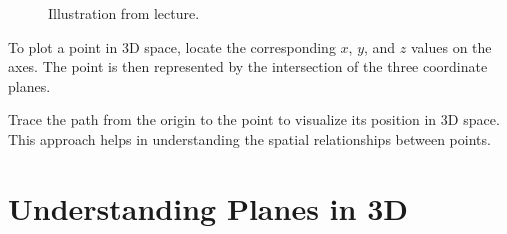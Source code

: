 \documentclass{article}
\begin{document}
\begin{examplebox}
\begin{illustrationbox}
\begin{blankbox}
\begin{figure}[H]
\begin{minipage}{0.6\textwidth}
            \caption{Illustration from lecture.}
            \label{fig:3d_point2}
        \end{minipage}
    \end{figure}
    \end{blankbox}
\end{illustrationbox}
\begin{conceptbox}
To plot a point in 3D space, locate the corresponding \( x \), \( y \), and \( z \) values on the axes. The point is then represented by the intersection of the three coordinate planes.
\end{conceptbox}
\begin{tipbox}
    Trace the path from the origin to the point to visualize its position in 3D space. This approach helps in understanding the spatial relationships between points.
\end{tipbox}
\end{examplebox}

\section*{Understanding Planes in 3D}
\end{document}

